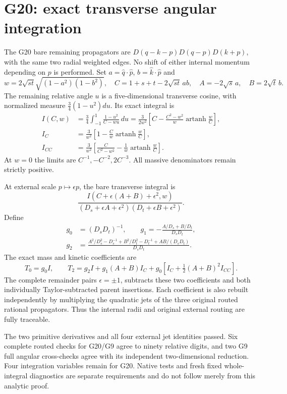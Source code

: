 \documentclass[11pt]{article}
\begin{document}
\section*{G20: exact transverse angular integration}
The G20 bare remaining propagators are
$D(q-k-p)D(q-p)D(k+p)$, with the same two radial weighted edges.
No shift of either internal momentum depending on $p$ is performed.
Set $a=\widehat q\cdot\widehat p$, $b=\widehat k\cdot\widehat p$ and
\[
 w=2\sqrt{st}\sqrt{(1-a^2)(1-b^2)},\quad
 C=1+s+t-2\sqrt{st}\,ab,\quad
 A=-2\sqrt{s}\,a,\quad B=2\sqrt{t}\,b.
\]
The remaining relative angle $u$ is a five-dimensional transverse cosine,
with normalized measure $\tfrac34(1-u^2)du$. Its exact integral is
\begin{align*}
 I(C,w)&=\frac34\int_{-1}^1\frac{1-u^2}{C-wu}\,du
 =\frac{3}{2w^2}\left[C-\frac{C^2-w^2}{w}
           \operatorname{artanh}\frac wC\right],\\
 I_C&=\frac3{w^2}\left[1-\frac Cw\operatorname{artanh}\frac wC\right],\\
 I_{CC}&=\frac3{w^2}\left[\frac C{C^2-w^2}
                        -\frac1w\operatorname{artanh}\frac wC\right].
\end{align*}
At $w=0$ the limits are $C^{-1},-C^{-2},2C^{-3}$.
All massive denominators remain strictly positive.

At external scale $p\mapsto\epsilon p$, the bare transverse integral is
\[
 \frac{I(C+\epsilon(A+B)+\epsilon^2,w)}
 {(D_s+\epsilon A+\epsilon^2)(D_t+\epsilon B+\epsilon^2)}.
\]
Define
\begin{align*}
 g_0&=(D_sD_t)^{-1},\qquad
 g_1=-\frac{A/D_s+B/D_t}{D_sD_t},\\
 g_2&=\frac{A^2/D_s^2-D_s^{-1}+B^2/D_t^2-D_t^{-1}
                      +AB/(D_sD_t)}{D_sD_t}.
\end{align*}
The exact mass and kinetic coefficients are
\[
 T_0=g_0 I,\qquad
 T_2=g_2 I+g_1(A+B)I_C
          +g_0\left[I_C+\tfrac12(A+B)^2I_{CC}\right].
\]
The complete remainder pairs $\epsilon=\pm1$, subtracts these two
coefficients and both individually Taylor-subtracted parent insertions.
Each coefficient is also rebuilt independently by multiplying the
quadratic jets of the three original routed rational propagators.
Thus the internal radii and original external routing are fully traceable.

The two primitive derivatives and all four external jet identities passed.
Six complete routed checks for G20/G9 agree to ninety relative digits,
and two G9 full angular cross-checks agree with its independent
two-dimensional reduction. Four integration variables remain for G20.
Native tests and fresh fixed whole-integral diagnostics are separate
requirements and do not follow merely from this analytic proof.
\end{document}
